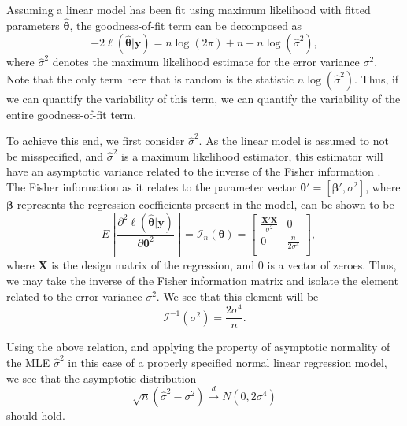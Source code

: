 \documentclass[sn-mathphys-ay]{sn-jnl}
\begin{document}
		Assuming a linear model has been fit using maximum likelihood with fitted parameters $\hat{\bm{\theta}}$, the goodness-of-fit term can be decomposed as
		\begin{equation}
			-2 \ell (\hat{\bm{\theta}} | \bm{y} ) = n \log(2 \pi) + n + n \log(\hat{\sigma}^2 ) ,
		\end{equation}
		where $\hat{\sigma}^2$ denotes the maximum likelihood estimate for the error variance $\sigma^2$. Note that the only term here that is random is
		the statistic $n \log(\hat{\sigma}^2)$. Thus, if we can quantify the variability of this term, we can quantify the variability of the entire goodness-of-fit
		term.

		To achieve this end, we first consider $\hat{\sigma}^2$. As the linear model is assumed to not be misspecified, and $\hat{\sigma}^2$ is a maximum likelihood
		estimator, this estimator will have an asymptotic variance related to the inverse of the Fisher information \citep{Fisher}. The Fisher information as it relates
		to the parameter vector $\bm{\theta}' = [\bm{\beta}', \sigma^2]$, where $\bm{\beta}$ represents the regression coefficients
		present in the model, can be shown to be
		\begin{equation*}
			- E \left[ \frac{\partial^2 \ell (\hat{\bm{\theta}} | \bm{y} )}{\partial \bm{\theta}^2} \right] = \bm{\mathcal{I}}_{n}(\bm{\theta}) =
			\begin{bmatrix}
				\frac{\bm{X}' \bm{X}}{\sigma^2} & 0 \\
				0 & \frac{n}{2 \sigma^4} \\
			\end{bmatrix}
			,
		\end{equation*}
		where $\bm{X}$ is the design matrix of the regression, and $0$ is a vector of zeroes. Thus, we may take the inverse of the Fisher information matrix and isolate
		the element related to the error variance $\sigma^2$. We see that this element will be
		\begin{equation*}
			\bm{\mathcal{I}}^{-1}(\sigma ^2) = \frac{2 \sigma ^4}{n} .
		\end{equation*}
		
		Using the above relation, and applying the property of asymptotic normality of the MLE $\hat{\sigma}^2$ in this case of a properly specified normal linear
		regression model, we see that the asymptotic distribution
		\begin{equation*}
			\sqrt{n} (\hat{\sigma}^2 - \sigma^2) \xrightarrow[]{d} N(0, 2 \sigma ^4 )
		\end{equation*}
		should hold.
\end{document}
